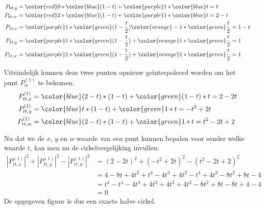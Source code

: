 \documentclass{report}
\begin{document}
\begin{enumerate}
{\begin{itemize}
\begin{equation*}
\begin{split}
					P_{0t, y} & = {\color{red}0} *  {\color{blue}(1 - t)} + {\color{purple}1} * {\color{blue}t} = t \\
					P_{0t, w} & = {\color{red}2} *  {\color{blue}(1 - t)} + {\color{purple}1} * {\color{blue}t} = 2 - t\\
					P_{1t, x} & = {\color{purple}1} * {\color{green}(1 - \frac{t}{2})} {\color{orange}- 1} * {\color{green}\frac{t}{2}} = 1 - t \\
					P_{1t, y} & = {\color{purple}1} *  {\color{green}(1 - \frac{t}{2})} + {\color{orange}1} * {\color{green}\frac{t}{2}} = 1 \\
					P_{1t, w} & = {\color{purple}1} *  {\color{green}(1 - \frac{t}{2})} + {\color{orange}1} * {\color{green}\frac{t}{2}} = 1\\
				\end{split}
			\end{equation*}

			Uiteindelijk kunnen deze twee punten opnieuw geïnterpoleerd worden om het punt $P_{tt}^{(1)}$ te bekomen.
			\begin{equation*}
				\begin{split}
					P_{tt, x}^{(1)} & = {\color{blue}(2 - t)} * (1 - t) + {\color{green}(1 - t)} * t  = 2 - 2t \\
					P_{tt, y}^{(1)} & = {\color{blue}t} *  (1 - t) + {\color{green}1} * t = -t^2 + 2t \\
					P_{tt, w}^{(1)} & = {\color{blue}(2 - t)} *  (1 - t) +  {\color{green}1} * t = t^2 - 2t + 2\\
				\end{split}
			\end{equation*}

			Nu dat we de $x$, $y$ en $w$ waarde van een punt kunnen bepalen voor eender welke waarde $t$, kan men nu de cirkelvergelijking invullen:
			\begin{equation*}
				\begin{split}
					|P_{tt, x}^{(1)}|^2 + |P_{tt, y}^{(1)}|^2 - |P_{tt, w}^{(1)}|^2 & = (2 - 2t)^2 + (-t^2 + 2t)^2 - (t^2 - 2t + 2)^2 \\
																  & =  4 - 8t + 4t^2 + t^4 - 4t^3 + 4t^2 - t^4 +4t^3 - 8t^2 + 8t - 4 \\
																  & = t^4 - t^4 - 4t^3 + 4t^3 +4t^2 + 4t^2 - 8t^2 + 8t - 8t + 4 - 4 \\
																  & = 0
				\end{split}
			\end{equation*}
			De opgegeven figuur is dus een exacte halve cirkel.


\end{itemize}}
\end{enumerate}
\end{document}
